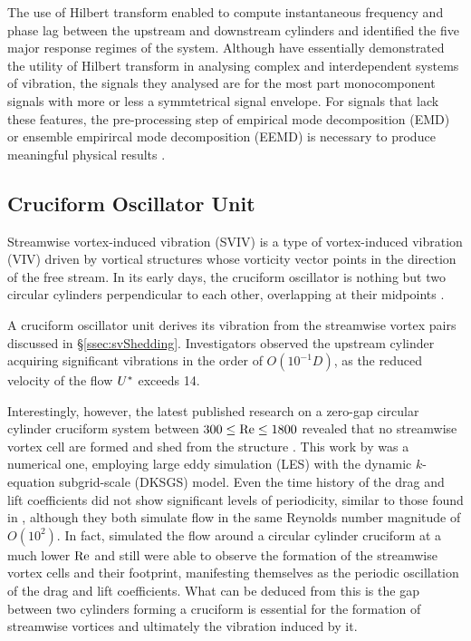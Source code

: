 \documentclass[oneside]{utmthesis}
\begin{document}
The use of Hilbert transform enabled \citet{Yuan2020} to compute instantaneous frequency and phase lag between the upstream and downstream cylinders and identified the five major response regimes of the system. Although \citet{Yuan2020} have essentially demonstrated the utility of Hilbert transform in analysing complex and interdependent systems of vibration, the signals they analysed are for the most part monocomponent signals with more or less a symmtetrical signal envelope. For signals that lack these features, the pre-processing step of empirical mode decomposition (EMD) or ensemble empirircal mode decomposition (EEMD) is necessary to produce meaningful physical results \citep{Huang2014,Chen2019}.

\subsection{Cruciform Oscillator Unit}
Streamwise vortex-induced vibration (SVIV) is a type of vortex-induced vibration (VIV) driven by vortical structures whose vorticity vector points in the direction of the free stream. In its early days, the cruciform oscillator is nothing but two circular cylinders perpendicular to each other, overlapping at their midpoints \citep{Zdravkovich1981,Zdravkovich1983,Zdravkovich1985}.

A cruciform oscillator unit derives its vibration from the streamwise vortex pairs discussed in \S\ref{ssec:svShedding}. Investigators observed the upstream cylinder acquiring significant vibrations in the order of $O(10^{-1}D)$, as the reduced velocity of the flow $U^{*}$ exceeds 14.

Interestingly, however, the latest published research on a zero-gap circular cylinder cruciform system between $300 \le \text{Re} \le 1800$ revealed that no streamwise vortex cell are formed and shed from the structure \citep{Tang2021}. This work by \citet{Tang2021} was a numerical one, employing large eddy simulation (LES) with the dynamic $k$-equation subgrid-scale (DKSGS) model. Even the time history of the drag and lift coefficients did not show significant levels of periodicity, similar to those found in \citet{Deng2007}, although they both simulate flow in the same Reynolds number magnitude of $O(10^{2})$. In fact, \citet{Deng2007} simulated the flow around a circular cylinder cruciform at a much lower $\text{Re}$ and still were able to observe the formation of the streamwise vortex cells and their footprint, manifesting themselves as the periodic oscillation of the drag and lift coefficients. What can be deduced from this is the gap between two cylinders forming a cruciform is essential for the formation of streamwise vortices and ultimately the vibration induced by it.
\end{document}
